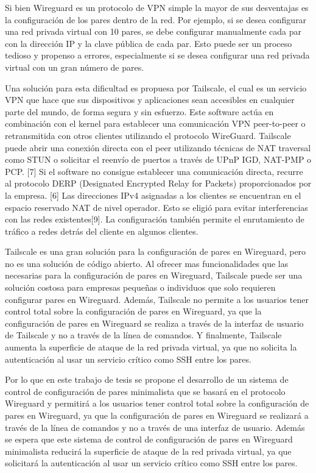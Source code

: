 \documentclass{article}
\begin{document}
Si bien Wireguard es un protocolo de VPN simple la mayor de sus desventajas es la configuración de los pares dentro de la red. Por ejemplo, si se desea configurar una red privada virtual con 10 pares, se debe configurar manualmente cada par con la dirección IP y la clave pública de cada par. Esto puede ser un proceso tedioso y propenso a errores, especialmente si se desea configurar una red privada virtual con un gran número de pares.

Una solución para esta dificultad es propuesa por Tailscale, el cual es un servicio VPN que hace que sus dispositivos y aplicaciones sean accesibles en cualquier parte del mundo, de forma segura y sin esfuerzo. Este software actúa en combinación con el kernel para establecer una comunicación VPN peer-to-peer o retransmitida con otros clientes utilizando el protocolo WireGuard. Tailscale puede abrir una conexión directa con el peer utilizando técnicas de NAT traversal como STUN o solicitar el reenvío de puertos a través de UPnP IGD, NAT-PMP o PCP. [7] Si el software no consigue establecer una comunicación directa, recurre al protocolo DERP (Designated Encrypted Relay for Packets) proporcionados por la empresa. [6] Las direcciones IPv4 asignadas a los clientes se encuentran en el espacio reservado NAT de nivel operador. Esto se eligió para evitar interferencias con las redes existentes[9]. La configuración también permite el enrutamiento de tráfico a redes detrás del cliente en algunos clientes.

Tailscale es una gran solución para la configuración de pares en Wireguard, pero no es una solución de código abierto. Al ofrecer mas funcionalidades que las necesarias para la configuración de pares en Wireguard, Tailscale puede ser una solución costosa para empresas pequeñas o individuos que solo requieren configurar pares en Wireguard. Además, Tailscale no permite a los usuarios tener control total sobre la configuración de pares en Wireguard, ya que la configuración de pares en Wireguard se realiza a través de la interfaz de usuario de Tailscale y no a través de la línea de comandos. Y finalmente, Tailscale aumenta la superficie de ataque de la red privada virtual, ya que no solicita la autenticación al usar un servicio crítico como SSH entre los pares.

Por lo que en este trabajo de tesis se propone el desarrollo de un sistema de control de configuración de pares minimalista que se basará en el protocolo Wireguard y permitirá a los usuarios tener control total sobre la configuración de pares en Wireguard, ya que la configuración de pares en Wireguard se realizará a través de la línea de comandos y no a través de una interfaz de usuario. Además se espera que este sistema de control de configuración de pares en Wireguard minimalista reducirá la superficie de ataque de la red privada virtual, ya que solicitará la autenticación al usar un servicio crítico como SSH entre los pares.
\end{document}

